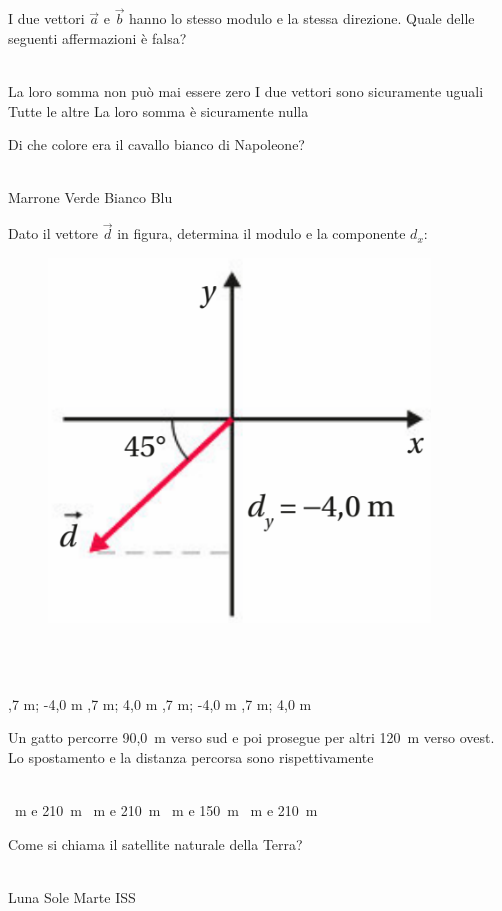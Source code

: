 \documentclass[a4paper,11pt]{exam}
\begin{document}
\begin{questions}
    
\question I due vettori $\vec{a}$ e $\vec{b}$ hanno lo stesso modulo e la stessa direzione. Quale delle seguenti affermazioni è falsa?\\\
\begin{oneparchoices}
  \choice La loro somma non può mai essere zero
  \choice I due vettori sono sicuramente uguali
  \choice Tutte le altre
  \choice La loro somma è sicuramente nulla
\end{oneparchoices}

    
\question Di che colore era il cavallo bianco di Napoleone?\\\
\begin{oneparchoices}
  \choice Marrone
  \choice Verde
  \choice Bianco
  \choice Blu 
\end{oneparchoices}

    
\question Dato il vettore $\vec{d}$ in figura, determina il modulo e la componente $d_x$: \begin{figure}[h!]   \begin{center}     \includegraphics[scale=0.35]{vettored.png}   \end{center} \end{figure}\\\
\begin{oneparchoices}
  ,7 m; -4,0 m
  ,7 m; 4,0 m
  \choice -5,7 m; -4,0 m
  \choice 5,7 m; 4,0 m
\end{oneparchoices}

    
\question Un gatto percorre 90,0~m verso sud e poi prosegue per altri 120~m verso ovest. Lo spostamento e la distanza percorsa sono rispettivamente\\\
\begin{oneparchoices}
  ~m e 210~m
  ~m e 210~m
  \choice 210~m e 150~m
  \choice 30~m e 210~m
\end{oneparchoices}

    
\question Come si chiama il satellite naturale della Terra?\\\
\begin{oneparchoices}
  \choice Luna
  \choice Sole
  \choice Marte
  \choice ISS
\end{oneparchoices}

    
\end{questions}
\end{document}
